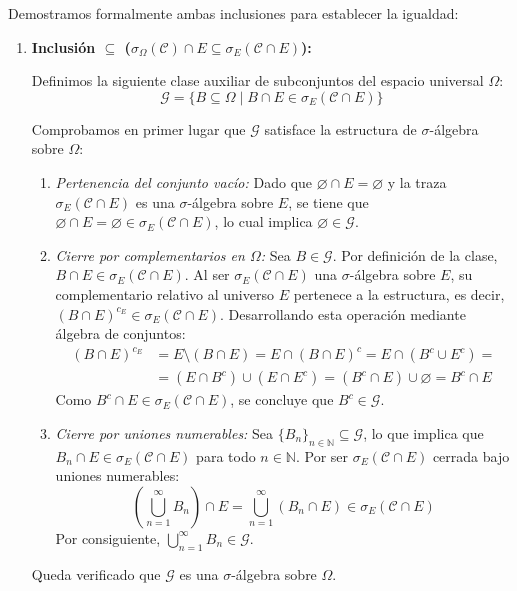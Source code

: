\begin{demostracion}
Demostramos formalmente ambas inclusiones para establecer la igualdad:

\begin{enumerate}
    \item \textbf{Inclusión $\subseteq$ ($\sigma_\Omega(\mathcal{C}) \cap E \subseteq \sigma_E(\mathcal{C} \cap E)$):}
    
    Definimos la siguiente clase auxiliar de subconjuntos del espacio universal $\Omega$:
    \[
        \mathcal{G} = \{ B \subseteq \Omega \mid B \cap E \in \sigma_E(\mathcal{C} \cap E) \}
    \]

    Comprobamos en primer lugar que $\mathcal{G}$ satisface la estructura de $\sigma$-álgebra sobre $\Omega$:
    \begin{enumerate}[label=\alph*)]
        \item \textit{Pertenencia del conjunto vacío:} Dado que $\varnothing \cap E = \varnothing$ y la traza $\sigma_E(\mathcal{C} \cap E)$ es una $\sigma$-álgebra sobre $E$, se tiene que $\varnothing \cap E = \varnothing \in \sigma_E(\mathcal{C} \cap E)$, lo cual implica $\varnothing \in \mathcal{G}$.
        
        \item \textit{Cierre por complementarios en $\Omega$:} Sea $B \in \mathcal{G}$. Por definición de la clase, $B \cap E \in \sigma_E(\mathcal{C} \cap E)$. Al ser $\sigma_E(\mathcal{C} \cap E)$ una $\sigma$-álgebra sobre $E$, su complementario relativo al universo $E$ pertenece a la estructura, es decir, $(B \cap E)^{c_E} \in \sigma_E(\mathcal{C} \cap E)$.
        Desarrollando esta operación mediante álgebra de conjuntos:
        \[
        \begin{array}{rl}
            \displaystyle (B \cap E)^{c_E} & \displaystyle = E \setminus (B \cap E) = E \cap (B \cap E)^c = E \cap (B^c \cup E^c) =  \\[8pt]
             & \displaystyle = (E \cap B^c) \cup (E \cap E^c) = (B^c \cap E) \cup \varnothing = B^c \cap E
        \end{array}
        \]
        Como $B^c \cap E \in \sigma_E(\mathcal{C} \cap E)$, se concluye que $B^c \in \mathcal{G}$.

        \item \textit{Cierre por uniones numerables:} Sea $\{B_n\}_{n \in \mathbb{N}} \subseteq \mathcal{G}$, lo que implica que $B_n \cap E \in \sigma_E(\mathcal{C} \cap E)$ para todo $n \in \mathbb{N}$. Por ser $\sigma_E(\mathcal{C} \cap E)$ cerrada bajo uniones numerables:
        \[
            \left( \bigcup_{n=1}^\infty B_n \right) \cap E = \bigcup_{n=1}^\infty (B_n \cap E) \in \sigma_E(\mathcal{C} \cap E)
        \]
        Por consiguiente, $\bigcup_{n=1}^\infty B_n \in \mathcal{G}$.
    \end{enumerate}
    Queda verificado que $\mathcal{G}$ es una $\sigma$-álgebra sobre $\Omega$.


\end{enumerate}
\end{demostracion}
